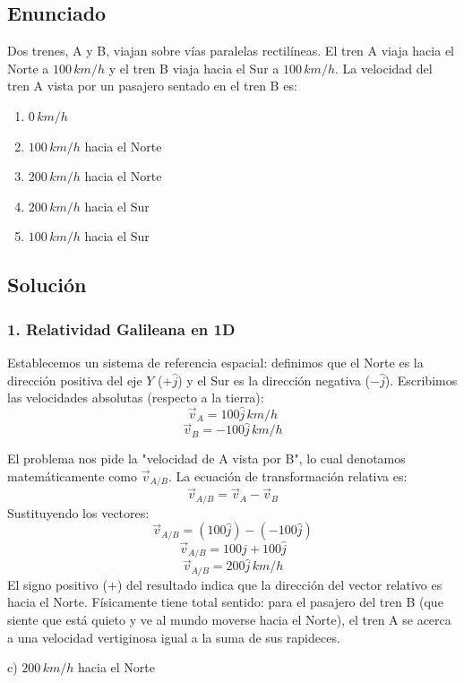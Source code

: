\documentclass[12pt, a4paper]{article}
\begin{document}
\newpage

\subsection*{Enunciado}
Dos trenes, A y B, viajan sobre vías paralelas rectilíneas. El tren A viaja hacia el Norte a $100\,\si{km/h}$ y el tren B viaja hacia el Sur a $100\,\si{km/h}$. La velocidad del tren A vista por un pasajero sentado en el tren B es:
\begin{enumerate}[label=\alph*)]
    \item $0\,\si{km/h}$
    \item $100\,\si{km/h}$ hacia el Norte
    \item $200\,\si{km/h}$ hacia el Norte
    \item $200\,\si{km/h}$ hacia el Sur
    \item $100\,\si{km/h}$ hacia el Sur
\end{enumerate}

\subsection*{Solución}

\subsubsection*{1. Relatividad Galileana en 1D}
Establecemos un sistema de referencia espacial: definimos que el Norte es la dirección positiva del eje $Y$ ($+\hat{j}$) y el Sur es la dirección negativa ($-\hat{j}$).
Escribimos las velocidades absolutas (respecto a la tierra):
$$ \vec{v}_A = 100\hat{j} \,\si{km/h} $$
$$ \vec{v}_B = -100\hat{j} \,\si{km/h} $$

El problema nos pide la "velocidad de A vista por B", lo cual denotamos matemáticamente como $\vec{v}_{A/B}$.
La ecuación de transformación relativa es:
$$ \vec{v}_{A/B} = \vec{v}_A - \vec{v}_B $$
Sustituyendo los vectores:
$$ \vec{v}_{A/B} = (100\hat{j}) - (-100\hat{j}) $$
$$ \vec{v}_{A/B} = 100\hat{j} + 100\hat{j} $$
$$ \vec{v}_{A/B} = 200\hat{j} \,\si{km/h} $$
El signo positivo ($+$) del resultado indica que la dirección del vector relativo es hacia el Norte. Físicamente tiene total sentido: para el pasajero del tren B (que siente que está quieto y ve al mundo moverse hacia el Norte), el tren A se acerca a una velocidad vertiginosa igual a la suma de sus rapideces.

\begin{tcolorbox}[colback=green!5!white, colframe=green!50!black, title=Respuesta Final]
\centering \Large c) $200\,\si{km/h}$ hacia el Norte
\end{tcolorbox}
\end{document}
